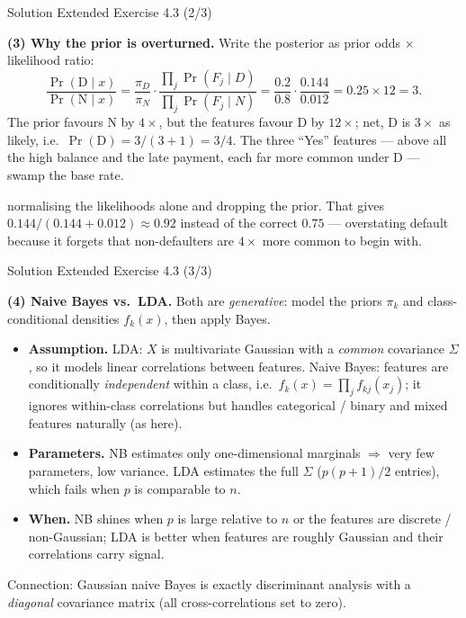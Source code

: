 \documentclass[aspectratio=169,11pt]{beamer}
\begin{document}
\begin{frame}{Solution \textemdash{} Extended Exercise 4.3 (2/3)}
\begin{solutionbox}
\textbf{(3) Why the prior is overturned.}
Write the posterior as prior odds $\times$ likelihood ratio:
\[
  \frac{\Pr(\text{D}\mid x)}{\Pr(\text{N}\mid x)}
  =\frac{\pi_D}{\pi_N}\cdot\frac{\prod_j\Pr(F_j\mid D)}{\prod_j\Pr(F_j\mid N)}
  =\frac{0.2}{0.8}\cdot\frac{0.144}{0.012}=0.25\times 12=3 .
\]
The prior favours N by $4\times$, but the features favour D by $12\times$;
net, D is $3\times$ as likely, i.e.\ $\Pr(\text{D})=3/(3+1)=3/4$. The
three ``Yes'' features --- above all the high balance and the late
payment, each far more common under D --- swamp the base rate.
\end{solutionbox}
\begin{mistake}
normalising the likelihoods alone and dropping the
prior. That gives $0.144/(0.144+0.012)\approx 0.92$ instead of the
correct $0.75$ --- overstating default because it forgets that
non-defaulters are $4\times$ more common to begin with.
\end{mistake}
\end{frame}

\begin{frame}{Solution \textemdash{} Extended Exercise 4.3 (3/3)}
\begin{solutionbox}
\textbf{(4) Naive Bayes vs.\ LDA.} Both are \emph{generative}: model the
priors $\pi_k$ and class-conditional densities $f_k(x)$, then apply Bayes.
\begin{itemize}
  \item \textbf{Assumption.} LDA: $X$ is multivariate Gaussian with a
        \emph{common} covariance $\Sigma$, so it models linear
        correlations between features. Naive Bayes: features are
        conditionally \emph{independent} within a class, i.e.\
        $f_k(x)=\prod_j f_{kj}(x_j)$; it ignores within-class
        correlations but handles categorical / binary and mixed features
        naturally (as here).
  \item \textbf{Parameters.} NB estimates only one-dimensional marginals
        $\Rightarrow$ very few parameters, low variance. LDA estimates the
        full $\Sigma$ ($p(p+1)/2$ entries), which fails when $p$ is
        comparable to $n$.
  \item \textbf{When.} NB shines when $p$ is large relative to $n$ or the
        features are discrete / non-Gaussian; LDA is better when features
        are roughly Gaussian and their correlations carry signal.
\end{itemize}
Connection: Gaussian naive Bayes is exactly discriminant analysis with a
\emph{diagonal} covariance matrix (all cross-correlations set to zero).
\end{solutionbox}
\end{frame}
\end{document}
